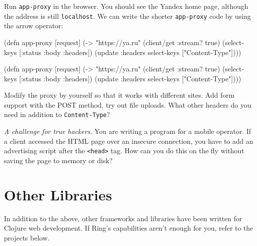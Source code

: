 \fi

Run \verb|app-proxy| in the browser. You should see the Yandex home page, although the address is still \verb|localhost|. We can write the shorter \verb|app-proxy| code by using the arrow operator:

\ifx\DEVICETYPE\MOBILE

\begin{clojure}
(defn app-proxy [request]
  (-> "https://ya.ru"
      (client/get {:stream? true})
      (select-keys [:status
                    :body :headers])
      (update :headers
        select-keys ["Content-Type"])))
\end{clojure}

\else

\begin{clojure}
(defn app-proxy [request]
  (-> "https://ya.ru"
      (client/get {:stream? true})
      (select-keys [:status :body :headers])
      (update :headers select-keys ["Content-Type"])))
\end{clojure}

\fi

Modify the proxy by yourself so that it works with different sites. Add form support with the POST method, try out file uploads. What other headers do you need in addition to \verb|Content-Type|?

\emph{A challenge for true hackers.} You are writing a program for a mobile operator. If a client accessed the HTML page over an insecure connection, you have to add an advertising script after the \verb|<head>| tag. How can you do this on the fly without saving the page to memory or disk?

\section{Other Libraries}

In addition to the above, other frameworks and libraries have been written for Clojure web development. If Ring's capabilities aren't enough for you, refer to the projects below.

